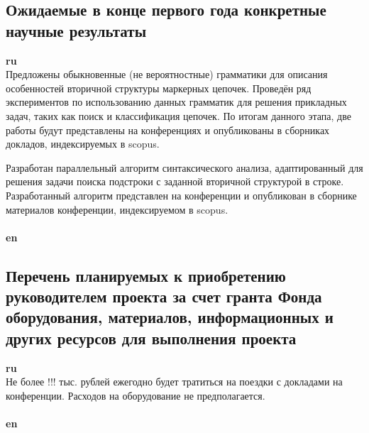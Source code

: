 \documentclass[12pt]{article}  %
\theoremstyle{remark}
\begin{document}
\subsection{Ожидаемые в конце первого года конкретные научные результаты}

\textbf{ru}\\
Предложены обыкновенные (не вероятностные) грамматики для описания особенностей вторичной структуры маркерных цепочек.
Проведён ряд экспериментов по использованию данных грамматик для решения прикладных задач, таких как поиск и классификация цепочек.
По итогам данного этапа, две работы будут представлены на конференциях и опубликованы в сборниках докладов, индексируемых в scopus.

Разработан параллельный алгоритм синтаксического анализа, адаптированный для решения задачи поиска подстроки с заданной вторичной структурой в строке.
Разработанный алгоритм представлен на конференции и опубликован в сборнике материалов конференции, индексируемом в scopus.
\\
\\
\textbf{en}\\

\subsection{Перечень планируемых к приобретению руководителем проекта за счет гранта Фонда оборудования, материалов, информационных и других ресурсов для выполнения проекта}

\textbf{ru}\\
Не более !!! тыс. рублей ежегодно будет тратиться на поездки с докладами на конференции. Расходов на оборудование не предполагается.
\\
\\
\textbf{en}\\
\end{document}
